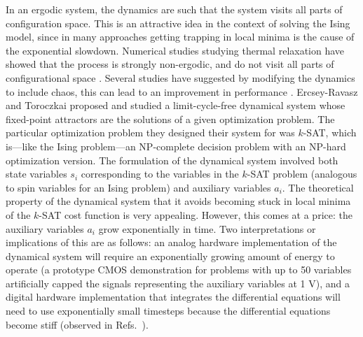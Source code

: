 \documentclass[fleqn,10pt]{wlscirep}
\begin{document}
In an ergodic system, the dynamics are such that the system visits 
all parts of configuration space.  
This is an attractive idea in the context of solving the Ising model, since in many 
approaches getting trapping in local minima is the cause of the exponential slowdown. 
Numerical studies studying thermal relaxation have showed that the process is strongly
non-ergodic, and do not visit all parts of configurational space \cite{bernaschi2020strong}. 
Several studies have suggested by modifying the dynamics to include chaos, 
this can lead to an improvement in performance \cite{ercsey2011optimization,molnar2018continuous,leleu2019destabilization,leleu2020chaotic}. 
Ercsey-Ravasz and Toroczkai proposed and studied\cite{ercsey2011optimization} a limit-cycle-free dynamical system whose fixed-point attractors are the solutions of a given optimization problem. The particular optimization problem they designed their system for was $k$-SAT, which is---like the Ising problem---an NP-complete decision problem with an NP-hard optimization version. The formulation of the dynamical system involved both state variables $s_i$ corresponding to the variables in the $k$-SAT problem (analogous to spin variables for an Ising problem) and auxiliary variables $ a_i $. The theoretical property of the dynamical system that it avoids becoming stuck in local minima of the $k$-SAT cost function is very appealing. However, this comes at a price: the auxiliary variables $ a_i $ grow exponentially in time. Two interpretations or implications of this are as follows: an analog hardware implementation of the dynamical system will require an exponentially growing amount of energy to operate (a prototype CMOS demonstration\cite{yin2017efficient} for problems with up to 50 variables artificially capped the signals representing the auxiliary variables at 1 V), and a digital hardware implementation that integrates the differential equations will need to use exponentially small timesteps because the differential equations become stiff (observed in Refs.~\cite{ercsey2011optimization,molnar2018continuous}).
\end{document}
